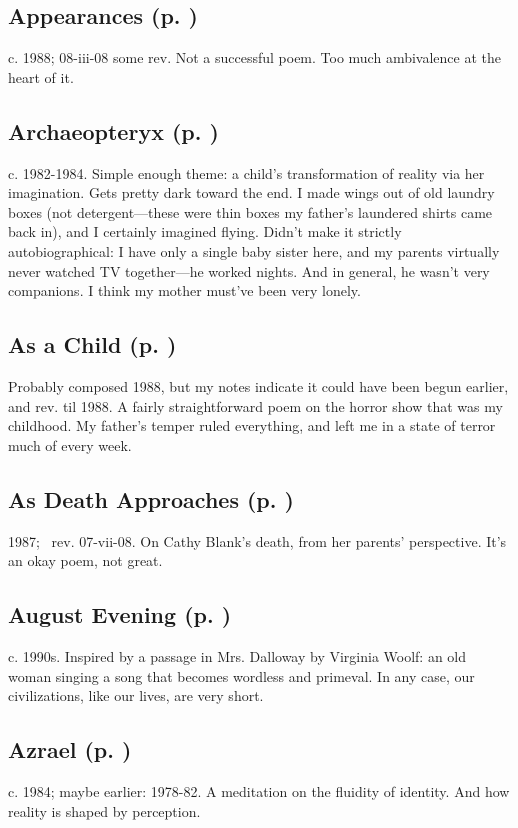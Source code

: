 \subsection*{Appearances (p. \pageref{ch:appearances})}
c. 1988; 08-iii-08 some rev. Not a successful poem. Too
much ambivalence at the heart of it.

\subsection*{Archaeopteryx (p. \pageref{ch:archaeopteryx})}
c. 1982-1984. Simple enough theme: a child's
transformation of reality via her imagination. Gets pretty dark toward
the end. I made wings out of old laundry boxes (not detergent---these
were thin boxes my father's laundered shirts came back in), and I
certainly imagined flying. Didn't make it strictly autobiographical: I
have only a single baby sister here, and my parents virtually never
watched TV together---he worked nights. And in general, he wasn't very
companions. I think my mother must've been very lonely.

\subsection*{As a Child (p. \pageref{ch:as_a_child})}
Probably composed 1988, but my notes indicate it could have been begun
earlier, and rev. til 1988. A fairly straightforward
poem on the horror show that was my childhood. My father's temper ruled
everything, and left me in a state of terror much of every
week.

\subsection*{As Death Approaches (p. \pageref{ch:as_death_approaches})}
1987;~ rev. 07-vii-08. On Cathy Blank's death, from her
parents' perspective. It's an okay poem, not
great.

\subsection*{August Evening (p. \pageref{ch:august_evening})}
c. 1990s. Inspired by a passage in Mrs. Dalloway by
Virginia Woolf: an old woman singing a song that becomes wordless and
primeval. In any case, our civilizations, like our lives, are very
short.

\subsection*{Azrael (p. \pageref{ch:azrael})}
c. 1984; maybe earlier: 1978-82. A meditation on the
fluidity of identity. And how reality is shaped by perception.

